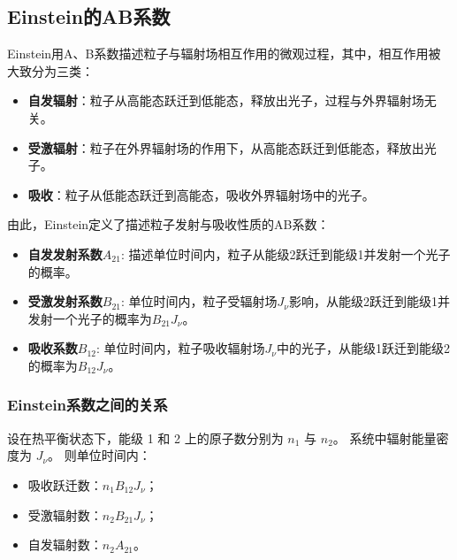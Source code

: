 \subsection{Einstein的AB系数}
Einstein用A、B系数描述粒子与辐射场相互作用的微观过程，其中，相互作用被大致分为三类：
\begin{itemize}
  \item \textbf{自发辐射}：粒子从高能态跃迁到低能态，释放出光子，过程与外界辐射场无关。
  \item \textbf{受激辐射}：粒子在外界辐射场的作用下，从高能态跃迁到低能态，释放出光子。
  \item \textbf{吸收}：粒子从低能态跃迁到高能态，吸收外界辐射场中的光子。
\end{itemize}
由此，Einstein定义了描述粒子发射与吸收性质的AB系数：
\begin{itemize}
    \item \textbf{自发发射系数$A_{21}$}: 描述单位时间内，粒子从能级2跃迁到能级1并发射一个光子的概率。
    \item \textbf{受激发射系数$B_{21}$}: 单位时间内，粒子受辐射场$J_\nu$影响，从能级2跃迁到能级1并发射一个光子的概率为$B_{21} J_\nu$。
    \item \textbf{吸收系数$B_{12}$}: 单位时间内，粒子吸收辐射场$J_\nu$中的光子，从能级1跃迁到能级2的概率为$B_{12} J_\nu$。
\end{itemize}

\subsubsection{Einstein系数之间的关系}
设在热平衡状态下，能级 1 和 2 上的原子数分别为 $n_1$ 与 $n_2$。
系统中辐射能量密度为 $J_\nu$。  
则单位时间内：
\begin{itemize}
  \item 吸收跃迁数：$n_1 B_{12} J_\nu$；
  \item 受激辐射数：$n_2 B_{21} J_\nu$；
  \item 自发辐射数：$n_2 A_{21}$。
\end{itemize}




